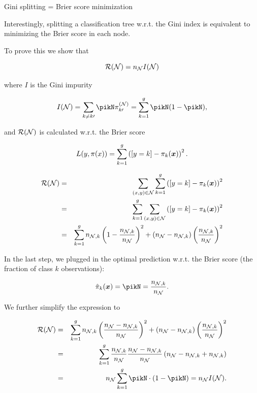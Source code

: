 \begin{vbframe}{Gini splitting = Brier score minimization}


Interestingly, splitting a classification tree w.r.t. the Gini index is equivalent to minimizing the Brier score in each node. 

\lz 

To prove this we show that 


$$
  \mathcal{R}(\mathcal{N}) = n_{\mathcal{N}} I(\mathcal{N})
$$
  
  where $I$ is the Gini impurity 

$$I(\Np) = \sum_{k\neq k\prime} \pikN \pi^{(\Np)}_{k\prime} = \sum_{k=1}^g \pikN(1-\pikN),
$$



  and $\mathcal{R}(\mathcal{N})$ is calculated w.r.t. the Brier score

$$
  L(y, \pi(x)) = \sum_{k = 1}^g \left([y = k] - \pi_k(\bm{x})\right)^2.
$$

\framebreak


\begin{eqnarray*}
\mathcal{R}(\mathcal{N}) &=& \sum_{(x, y) \in \mathcal{N}}  \sum_{k = 1}^g \left([y = k] - \pi_k(\bm{x})\right)^2 \\
&=& \sum_{k = 1}^g \sum_{(x, y) \in \mathcal{N}}   \left([y = k] - \pi_k(\bm{x})\right)^2 \\
&=& \sum_{k = 1}^g n_{\mathcal{N},k}\left(1 - \frac{n_{\mathcal{N},k}}{n_{\mathcal{N} }}\right)^2 + (n_{\mathcal{N} } - n_{\mathcal{N},k})\left(\frac{n_{\mathcal{N},k}}{n_{\mathcal{N} }}\right)^2
\end{eqnarray*}


In the last step, we plugged in the optimal prediction w.r.t. the Brier score (the fraction of class $k$ observations):

$$\hat \pi_k(\xv)= \pikN = \frac{n_{\Np,k}}{n_{\Np }}.$$ 


We further simplify the expression to

\begin{eqnarray*}
\risk(\Np) &=&  \sum_{k = 1}^g n_{\Np,k}\left(\frac{n_{\Np } - n_{\Np,k}}{n_{\Np }}\right)^2 + (n_{\Np } - n_{\Np,k})\left(\frac{n_{\Np,k}}{n_{\Np }}\right)^2 \\
&=& \sum_{k = 1}^g \frac{n_{\Np,k}}{n_{\Np }} \frac{n_{\Np } - n_{\Np,k}}{n_{\Np }} \left(n_{\Np } - n_{\Np,k } + n_{\Np,k}\right) \\
&=& n_{\Np } \sum_{k = 1}^g \pikN \cdot (1 - \pikN) = n_\Np I(\Np).
\end{eqnarray*}

\end{vbframe}



